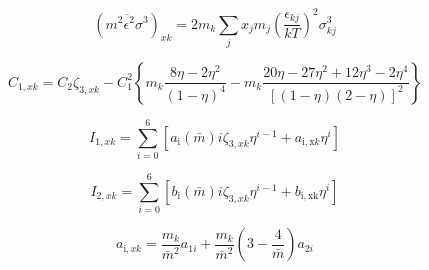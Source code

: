 \documentclass[12pt, letterpaper]{article}
\begin{document}
\begin{equation}
    (\overline{m^2\epsilon^2\sigma^3})_{xk}=2m_{k}\sum_{j}x_{j}m_{j}\left(\frac{\epsilon_{kj}}{kT}\right)^2\sigma_{kj}^3
    \label{eq:m2eps2sigma3_xk}
\end{equation}


\begin{equation}
    C_{1,xk}=C_{2}\zeta_{3,xk}-C_{1}^{2}\left\{m_{k}\frac{8\eta-2\eta^{2}}{\left(1-\eta\right)^{4}}-m_{k}\frac{20\eta-27\eta^{2}+12\eta^{3}-2\eta^{4}}{\left[(1-\eta)(2-\eta)\right]^{2}}\right\}
    \label{eq:c1_xk}
\end{equation}


\begin{equation}
    I_{1,xk}=\sum_{i=0}^{6}[a_{\mathrm{i}}(\bar{m})i\zeta_{3,xk}\eta^{i-1}+a_{\mathrm{i,x}k}\eta^{i}]
    \label{eq:i1_xk}
\end{equation}


\begin{equation}
    I_{2,xk}=\sum_{i=0}^{6}[b_{\mathrm{i}}(\bar{m})i\zeta_{3,xk}\eta^{i-1}+b_{\mathrm{i,xk}}\eta^{i}]
    \label{eq:i2_xk}
\end{equation}


\begin{equation}
    a_{\mathrm{i},xk}=\frac{m_{k}}{\bar{m}^{2}}a_{1i}+\frac{m_{k}}{\bar{m}^{2}}\left(3-\frac{4}{\bar{m}}\right)a_{2i}
    \label{eq:a_i_xk}
\end{equation}
\end{document}
